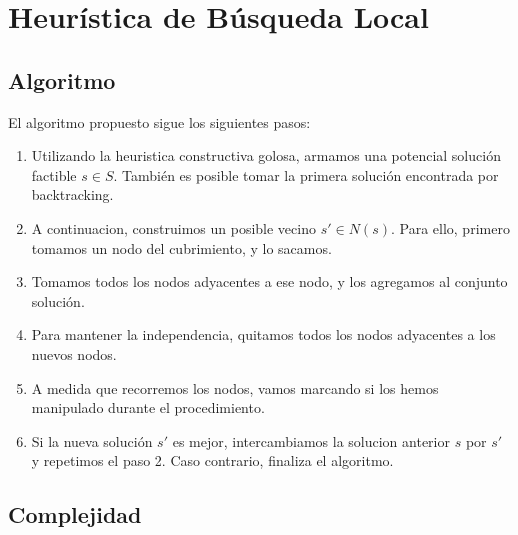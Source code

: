 \section{Heurística de Búsqueda Local}

\subsection{Algoritmo}

El algoritmo propuesto sigue los siguientes pasos:

\begin{enumerate}
\item Utilizando la heuristica constructiva golosa, armamos una potencial solución factible $s \in S$. También es posible tomar la primera solución encontrada por backtracking.
\item A continuacion, construimos un posible vecino $s' \in N(s)$. Para ello, primero tomamos un nodo del cubrimiento, y lo sacamos.
\item Tomamos todos los nodos adyacentes a ese nodo, y los agregamos al conjunto solución.
\item Para mantener la independencia, quitamos todos los nodos adyacentes a los nuevos nodos.
\item A medida que recorremos los nodos, vamos marcando si los hemos manipulado durante el procedimiento.
\item Si la nueva solución $s'$ es mejor, intercambiamos la solucion anterior $s$ por $s'$ y repetimos el paso 2. Caso contrario, finaliza el algoritmo.
\end{enumerate}

\subsection{Complejidad}